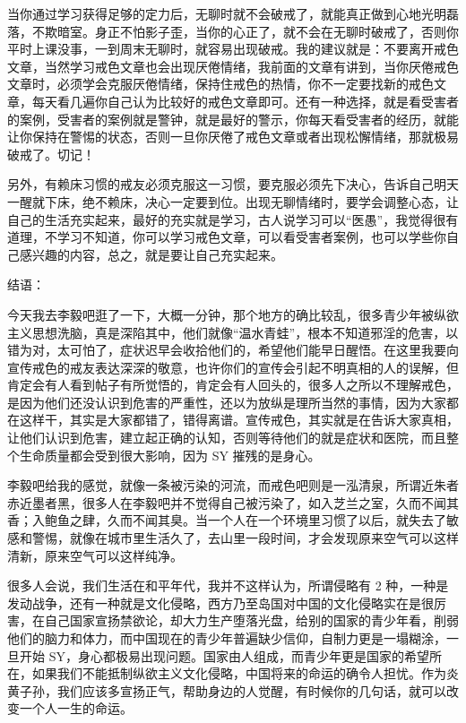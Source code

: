 \documentclass{ctexart}
\begin{document}
当你通过学习获得足够的定力后，无聊时就不会破戒了，就能真正做到心地光明磊落，不欺暗室。身正不怕影子歪，当你的心正了，就不会在无聊时破戒了，否则你平时上课没事，一到周末无聊时，就容易出现破戒。我的建议就是：不要离开戒色文章，当然学习戒色文章也会出现厌倦情绪，我前面的文章有讲到，当你厌倦戒色文章时，必须学会克服厌倦情绪，保持住戒色的热情，你不一定要找新的戒色文章，每天看几遍你自己认为比较好的戒色文章即可。还有一种选择，就是看受害者的案例，受害者的案例就是警钟，就是最好的警示，你每天看受害者的经历，就能让你保持在警惕的状态，否则一旦你厌倦了戒色文章或者出现松懈情绪，那就极易破戒了。切记！

另外，有赖床习惯的戒友必须克服这一习惯，要克服必须先下决心，告诉自己明天一醒就下床，绝不赖床，决心一定要到位。出现无聊情绪时，要学会调整心态，让自己的生活充实起来，最好的充实就是学习，古人说学习可以“医愚”，我觉得很有道理，不学习不知道，你可以学习戒色文章，可以看受害者案例，也可以学些你自己感兴趣的内容，总之，就是要让自己充实起来。

结语：

今天我去李毅吧逛了一下，大概一分钟，那个地方的确比较乱，很多青少年被纵欲主义思想洗脑，真是深陷其中，他们就像“温水青蛙”，根本不知道邪淫的危害，以错为对，太可怕了，症状迟早会收拾他们的，希望他们能早日醒悟。在这里我要向宣传戒色的戒友表达深深的敬意，也许你们的宣传会引起不明真相的人的误解，但肯定会有人看到帖子有所觉悟的，肯定会有人回头的，很多人之所以不理解戒色，是因为他们还没认识到危害的严重性，还以为放纵是理所当然的事情，因为大家都在这样干，其实是大家都错了，错得离谱。宣传戒色，其实就是在告诉大家真相，让他们认识到危害，建立起正确的认知，否则等待他们的就是症状和医院，而且整个生命质量都会受到很大影响，因为 SY 摧残的是身心。

李毅吧给我的感觉，就像一条被污染的河流，而戒色吧则是一泓清泉，所谓近朱者赤近墨者黑，很多人在李毅吧并不觉得自己被污染了，如入芝兰之室，久而不闻其香；入鲍鱼之肆，久而不闻其臭。当一个人在一个环境里习惯了以后，就失去了敏感和警惕，就像在城市里生活久了，去山里一段时间，才会发现原来空气可以这样清新，原来空气可以这样纯净。

很多人会说，我们生活在和平年代，我并不这样认为，所谓侵略有 2 种，一种是发动战争，还有一种就是文化侵略，西方乃至岛国对中国的文化侵略实在是很厉害，在自己国家宣扬禁欲论，却大力生产堕落光盘，给别的国家的青少年看，削弱他们的脑力和体力，而中国现在的青少年普遍缺少信仰，自制力更是一塌糊涂，一旦开始 SY，身心都极易出现问题。国家由人组成，而青少年更是国家的希望所在，如果我们不能抵制纵欲主义文化侵略，中国将来的命运的确令人担忧。作为炎黄子孙，我们应该多宣扬正气，帮助身边的人觉醒，有时候你的几句话，就可以改变一个人一生的命运。
\end{document}
